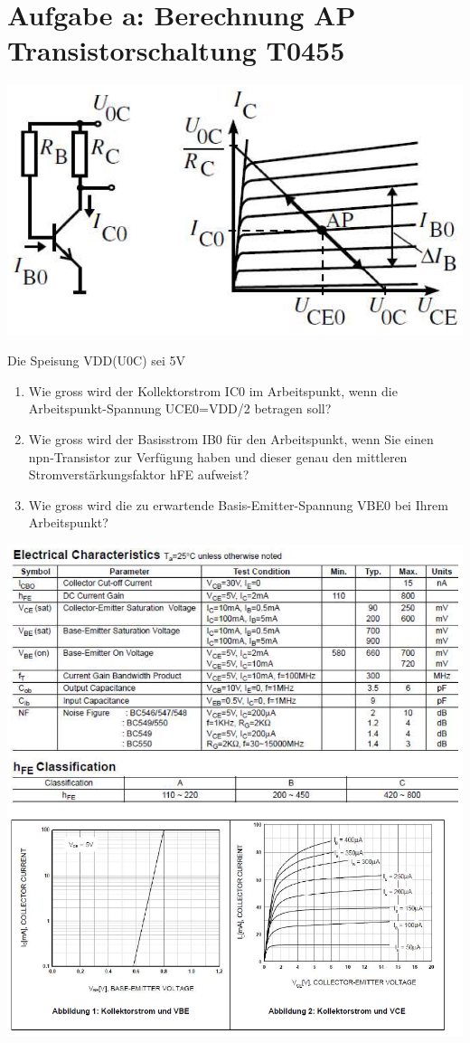 \newpage
\section*{Aufgabe a: Berechnung AP Transistorschaltung T0455}
\includegraphics[width=1\textwidth]{images/emitterStufe.png}

Die Speisung VDD(U0C) sei 5V

\begin{enumerate}
\item Wie gross wird der Kollektorstrom IC0 im Arbeitspunkt, wenn die Arbeitspunkt-Spannung
UCE0=VDD/2 betragen soll?
\item Wie gross wird der Basisstrom IB0 für den Arbeitspunkt, wenn Sie einen npn-Transistor zur Verfügung haben und dieser genau den mittleren Stromverstärkungsfaktor hFE aufweist?
\item Wie gross wird die zu erwartende Basis-Emitter-Spannung VBE0 bei Ihrem Arbeitspunkt?
\end{enumerate}

\newpage
\includegraphics[width=1.2\textwidth]{images/datasheetBC547.png}